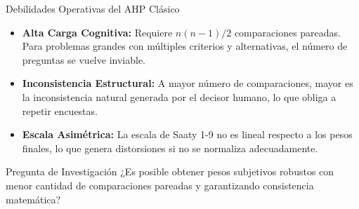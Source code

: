 \documentclass[aspectratio=169, 10pt]{beamer}
\begin{document}
\begin{frame}{Debilidades Operativas del AHP Clásico}
    \begin{itemize}
        \item \textbf{Alta Carga Cognitiva:} Requiere $n(n-1)/2$ comparaciones pareadas. Para problemas grandes con múltiples criterios y alternativas, el número de preguntas se vuelve inviable.
        \item \textbf{Inconsistencia Estructural:} A mayor número de comparaciones, mayor es la inconsistencia natural generada por el decisor humano, lo que obliga a repetir encuestas.
        \item \textbf{Escala Asimétrica:} La escala de Saaty 1-9 no es lineal respecto a los pesos finales, lo que genera distorsiones si no se normaliza adecuadamente.
    \end{itemize}
    \begin{block}{Pregunta de Investigación}
        ¿Es posible obtener pesos subjetivos robustos con menor cantidad de comparaciones pareadas y garantizando consistencia matemática?
    \end{block}
\end{frame}
\end{document}
